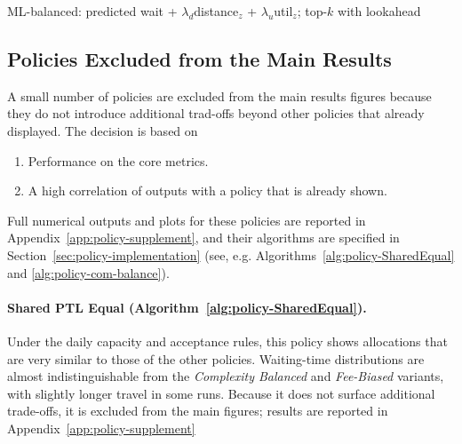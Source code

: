 \documentclass[ %
                    author={Nattanan Nawakitbamrung},
                supervisor={Dr. Sébastien Rochat},
                    degree={MSc},
                     title={Developing and Evaluating the Impact of a Single Patient Treatment List (PTL) for an NHS Integrated Care System},
                  subtitle={},
                      type={},
                      year={2025}]{dissertation}
\begin{document}
\clearpage
\begin{algorithm}[htbp]
\caption{ML-balanced: predicted wait + $\lambda_d$distance$_z$ + $\lambda_u$util$_z$; top-$k$ with lookahead}
\label{alg:policy-ml}
\end{algorithm}

\subsection{Policies Excluded from the Main Results}
A small number of policies are excluded from the main results figures because they do not introduce additional trad-offs beyond other policies that already displayed. The decision is based on
\begin{enumerate}
    \item Performance on the core metrics.
    \item A high correlation of outputs with a policy that is already shown.
\end{enumerate} 
Full numerical outputs and plots for these policies are reported in Appendix~\ref{app:policy-supplement}, and their algorithms are specified in Section~\ref{sec:policy-implementation} (see, e.g. Algorithms~\ref{alg:policy-SharedEqual} and \ref{alg:policy-com-balance}).

\paragraph{Shared PTL Equal (Algorithm~\ref{alg:policy-SharedEqual}).} Under the daily capacity and acceptance rules, this policy shows allocations that are very similar to those of the other policies. Waiting-time distributions are almost indistinguishable from the \textit{Complexity Balanced} and \textit{Fee-Biased} variants, with slightly longer travel in some runs. Because it does not surface additional trade-offs, it is excluded from the main figures; results are reported in Appendix~\ref{app:policy-supplement}
\end{document}
